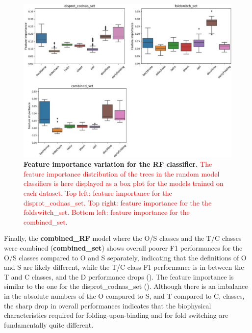 \begin{figure}[tbh]
    \centering
    \includegraphics[width=\linewidth]{ambiguous//figures_ambiguous/fig2.pdf}
    \caption{\textbf{Feature importance variation for the RF classifier.} \textcolor{red}{The feature importance distribution of the trees in the random model classifiers is here displayed as a box plot for the models trained on each dataset. Top left: feature importance for the disprot_codnas_set. Top right: feature importance for the the foldswitch_set. Bottom left: feature importance for the combined_set.}}
    \label{fig:chapter5:fig2}
\end{figure}

Finally, the \textbf{combined_RF} model where the O/S classes and the T/C classes were combined (\textbf{combined_set}) shows overall poorer F1 performances for the O/S classes compared to O and S separately, indicating that the definitions of O and S are likely different, while the T/C class F1 performance is in between the T and C classes, and the D performance drops (). The feature importance is similar to the one for the disprot_codnas_set (). Although there is an imbalance in the absolute numbers of the O compared to S, and T compared to C, classes, the sharp drop in overall performances indicates that the biophysical characteristics required for folding-upon-binding and for fold switching are fundamentally quite different.

